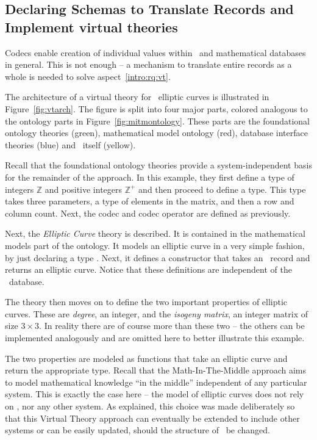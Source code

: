 \subsection{Declaring Schemas to Translate Records and Implement virtual theories}\label{sec:vt:schemas}


Codecs enable creation of individual values within \lmfdb\ and mathematical databases in general. 
This is not enough -- a mechanism to translate entire records as a whole is needed to solve aspect~\ref{intro:rq:vt}. 

The architecture of a virtual theory for \lmfdb\ elliptic curves is illustrated in Figure~\ref{fig:vtarch}. 
The figure is split into four major parts, colored analogous to the ontology parts in Figure~\ref{fig:mitmontology}. 
These parts are the foundational ontology theories (green), mathematical model ontology (red), database interface theories (blue) and \lmfdb\ itself (yellow). 

Recall that the foundational ontology theories provide a system-independent basis for the remainder of the approach. 
In this example, they first define a type of integers $\mathbb{Z}$ and positive integers $\mathbb{Z}^{+}$ and then proceed to define a  type. 
This type takes three parameters, a type of elements in the matrix, and then a row and column count. 
Next, the codec  and codec operator  are defined as previously. 

Next, the \textit{Elliptic Curve} theory is described. 
It is contained in the mathematical models part of the ontology. 
It models an elliptic curve in a very simple fashion, by just declaring a type . 
Next, it defines a  constructor that takes an \mmt\ record and returns an elliptic curve. 
Notice that these definitions are independent of the \lmfdb\ database. 

The theory then moves on to define the two important properties of elliptic curves. 
These are \textit{degree}, an integer, and the \textit{isogeny matrix}, an integer matrix of size $3 \times 3$. 
In reality there are of course more than these two -- the others can be implemented analogously and are omitted here to better illustrate this example. 

The two properties are modeled as functions that take an elliptic curve and return the appropriate type. 
Recall that the Math-In-The-Middle approach aims to model mathematical knowledge ``in the middle'' independent of any particular system.  
This is exactly the case here -- the model of elliptic curves does not rely on \lmfdb, nor any other system. 
As explained, this choice was made deliberately so that this Virtual Theory approach can eventually be extended to include other systems or can be easily updated, should the structure of \lmfdb\ be changed. 

